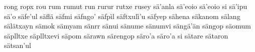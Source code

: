 \documentclass[a4paper]{article}
\begin{document}
rong\hspace{2mm}
ropx\hspace{2mm}
rou\hspace{2mm}
rum\hspace{2mm}
rumut\hspace{2mm}
run\hspace{2mm}
rurur\hspace{2mm}
rutxe\hspace{2mm}
rusey\hspace{2mm}
sä'anla\hspace{2mm}
sä'eoio\hspace{2mm}
sä'eoio si\hspace{2mm}
sä'ipu\hspace{2mm}
sä'o\hspace{2mm}
säfe'ul\hspace{2mm}
säflä\hspace{2mm}
säfmi\hspace{2mm}
säfngo'\hspace{2mm}
säfpìl\hspace{2mm}
säftxulì'u\hspace{2mm}
säfyep\hspace{2mm}
sähena\hspace{2mm}
säkanom\hspace{2mm}
sälang\hspace{2mm}
sälätxayn\hspace{2mm}
sämok\hspace{2mm}
sämyam\hspace{2mm}
sänrr\hspace{2mm}
sänui\hspace{2mm}
sänume\hspace{2mm}
sänumvi\hspace{2mm}
sängä'än\hspace{2mm}
sängop\hspace{2mm}
säomum\hspace{2mm}
säplltxe\hspace{2mm}
säplltxevi\hspace{2mm}
säpom\hspace{2mm}
särawn\hspace{2mm}
särengop\hspace{2mm}
säro'a\hspace{2mm}
säro'a si\hspace{2mm}
sätare\hspace{2mm}
sätaron\hspace{2mm}
sätsan'ul\hspace{2mm}
\end{document}
